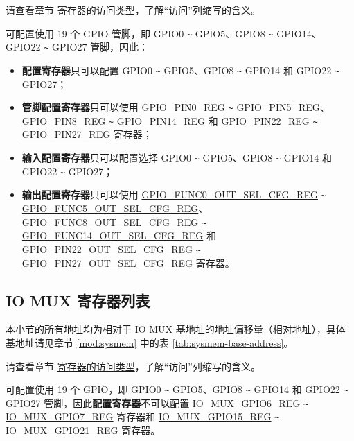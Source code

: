 \documentclass[main\_\_CN.tex]{subfiles}
\begin{document}
请查看章节 \hyperref[glossary-access-types]{寄存器的访问类型}，了解“访问”列缩写的含义。

\chipname{} 可配置使用 19 个 GPIO 管脚，即 GPIO0 \verb+~+ GPIO5、GPIO8 \verb+~+ GPIO14、GPIO22 \verb+~+ GPIO27 管脚，因此：
\begin{itemize}
    \item \textbf{配置寄存器}只可以配置 GPIO0 \verb+~+ GPIO5、GPIO8 \verb+~+ GPIO14 和 GPIO22 \verb+~+ GPIO27；
    \item \textbf{管脚配置寄存器}只可以使用 \hyperref[regdesc:GPIOPINNREG]{GPIO\_PIN0\_REG} \verb+~+ \hyperref[regdesc:GPIOPINNREG]{GPIO\_PIN5\_REG}、 \hyperref[regdesc:GPIOPINNREG]{GPIO\_PIN8\_REG} \verb+~+ \hyperref[regdesc:GPIOPINNREG]{GPIO\_PIN14\_REG} 和 \hyperref[regdesc:GPIOPINNREG]{GPIO\_PIN22\_REG} \verb+~+ \hyperref[regdesc:GPIOPINNREG]{GPIO\_PIN27\_REG} 寄存器；
    \item \textbf{输入配置寄存器}只可以配置选择 GPIO0 \verb+~+ GPIO5、GPIO8 \verb+~+ GPIO14 和 GPIO22 \verb+~+ GPIO27；
    \item \textbf{输出配置寄存器}只可以使用 \hyperref[regdesc:GPIOFUNCNOUTSELCFGREG]{GPIO\_FUNC0\_OUT\_SEL\_CFG\_REG} \verb+~+ \hyperref[regdesc:GPIOFUNCNOUTSELCFGREG]{GPIO\_FUNC5\_OUT\_SEL\_CFG\_REG}、 \hyperref[regdesc:GPIOFUNCNOUTSELCFGREG]{GPIO\_FUNC8\_OUT\_SEL\_CFG\_REG} \verb+~+ \hyperref[regdesc:GPIOFUNCNOUTSELCFGREG]{GPIO\_FUNC14\_OUT\_SEL\_CFG\_REG} 和 \hyperref[regdesc:GPIOFUNCNOUTSELCFGREG]{GPIO\_PIN22\_OUT\_SEL\_CFG\_REG} \verb+~+ \hyperref[regdesc:GPIOFUNCNOUTSELCFGREG]{GPIO\_PIN27\_OUT\_SEL\_CFG\_REG} 寄存器。
\end{itemize}

\label{section:4.12}



\subsection{IO MUX 寄存器列表}

本小节的所有地址均为相对于 IO MUX 基地址的地址偏移量（相对地址），具体基地址请见章节 \ref{mod:sysmem} \textit{} 中的表 \ref{tab:sysmem-base-address}。

请查看章节 \hyperref[glossary-access-types]{寄存器的访问类型}，了解“访问”列缩写的含义。

\chipname{} 可配置使用 19 个 GPIO，即 GPIO0 \verb+~+ GPIO5、GPIO8 \verb+~+ GPIO14 和 GPIO22 \verb+~+ GPIO27 管脚，因此\textbf{配置寄存器}不可以配置 \hyperref[regdesc:IOMUXGPIONREG]{IO\_MUX\_GPIO6\_REG} \verb+~+ \hyperref[regdesc:IOMUXGPIONREG]{IO\_MUX\_GPIO7\_REG} 寄存器和 \hyperref[regdesc:IOMUXGPIONREG]{IO\_MUX\_GPIO15\_REG} \verb+~+ \hyperref[regdesc:IOMUXGPIONREG]{IO\_MUX\_GPIO21\_REG} 寄存器。

\end{document}
